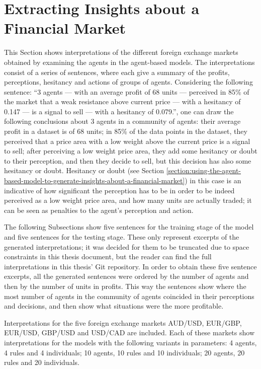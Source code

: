 



\section{Extracting Insights about a Financial Market}
\label{section:extracting-insights-about-a-financial-market}

This Section shows interpretations of the different foreign exchange markets
obtained by examining the agents in the agent-based models. The interpretations
consist of a series of sentences, where each give a summary of the profits,
perceptions, hesitancy and actions of groups of agents. Considering the
following sentence: ``3 agents — with an average profit of 68 units — perceived
in 85\% of the market that a weak resistance above current price — with a
hesitancy of 0.147 — is a signal to sell — with a hesitancy of 0.079.'', one can
draw the following conclusions about 3 agents in a community of agents: their
average profit in a dataset is of 68 units; in 85\% of the data points in the
dataset, they perceived that a price area with a low weight above the current
price is a signal to sell; after perceiving a low weight price area, they add
some hesitancy or doubt to their perception, and then they decide to sell, but
this decision has also some hesitancy or doubt. Hesitancy or doubt (see Section
\ref{section:using-the-agent-based-model-to-generate-insights-about-a-financial-market})
in this case is an indicative of how significant the perception has to be in
order to be indeed perceived as a low weight price area, and how many units are
actually traded; it can be seen as penalties to the agent's perception and
action.

The following Subsections show five sentences for the training stage of the
model and five sentences for the testing stage. These only represent excerpts of
the generated interpretations; it was decided for them to be truncated due to
space constraints in this thesis document, but the reader can find the full
interpretations in this thesis' Git repository. In order to obtain these five
sentence excerpts, all the generated sentences were ordered by the number of
agents and then by the number of units in profits. This way the sentences show
where the most number of agents in the community of agents coincided in their
perceptions and decisions, and then show what situations were the more
profitable.

Interpretations for the five foreign exchange markets AUD/USD, EUR/GBP, EUR/USD,
GBP/USD and USD/CAD are included. Each of these markets show interpretations for
the models with the following variants in parameters: 4 agents, 4 rules and 4
individuals; 10 agents, 10 rules and 10 individuals; 20 agents, 20 rules and 20
individuals.

